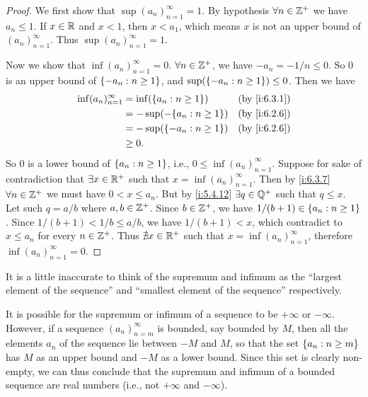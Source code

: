 \begin{proof}
  We first show that \(\sup(a_n)_{n = 1}^\infty = 1\).
  By hypothesis \(\forall n \in \mathbb{Z}^+\) we have \(a_n \leq 1\).
  If \(x \in \mathbb{R}\) and \(x < 1\), then \(x < a_1\), which means \(x\) is not an upper bound of \((a_n)_{n = 1}^\infty\).
  Thus \(\sup(a_n)_{n = 1}^\infty = 1\).

  Now we show that \(\inf(a_n)_{n = 1}^\infty = 0\).
  \(\forall n \in \mathbb{Z}^+\), we have \(-a_n = -1 / n \leq 0\).
  So \(0\) is an upper bound of \(\left\lbrace-a_n : n \geq 1\right\rbrace\), and \(\sup(\left\lbrace-a_n : n \geq 1\right\rbrace) \leq 0\).
  Then we have
  \begin{align*}
    \inf(a_n)_{n = 1}^\infty & = \inf(\set{a_n : n \geq 1})   &  & \by{i:6.3.1} \\
                             & = -\sup(-\set{a_n : n \geq 1}) &  & \by{i:6.2.6} \\
                             & = -\sup(\set{-a_n : n \geq 1}) &  & \by{i:6.2.6} \\
                             & \geq 0.
  \end{align*}
  So \(0\) is a lower bound of \(\left\lbrace a_n : n \geq 1\right\rbrace\), i.e., \(0 \leq \inf(a_n)_{n = 1}^\infty\).
  Suppose for sake of contradiction that \(\exists x \in \mathbb{R}^+\) such that \(x = \inf(a_n)_{n = 1}^\infty\).
  Then by \cref{i:6.3.7} \(\forall n \in \mathbb{Z}^+\) we must have \(0 < x \leq a_n\).
  But by \cref{i:5.4.12} \(\exists q \in \mathbb{Q}^+\) such that \(q \leq x\).
  Let such \(q = a / b\) where \(a, b \in \mathbb{Z}^+\).
  Since \(b \in \mathbb{Z}^+\), we have \(1 / (b + 1) \in \left\lbrace a_n : n \geq 1\right\rbrace\).
  Since \(1 / (b + 1) < 1 / b \leq a / b\), we have \(1 / (b + 1) < x\), which contradict to \(x \leq a_n\) for every \(n \in \mathbb{Z}^+\).
  Thus \(\nexists x \in \mathbb{R}^+\) such that \(x = \inf(a_n)_{n = 1}^\infty\), therefore \(\inf(a_n)_{n = 1}^\infty = 0\).
\end{proof}

\begin{note}
  It is a little inaccurate to think of the supremum and infimum as the ``largest element of the sequence'' and ``smallest element of the sequence'' respectively.
\end{note}

\begin{note}
  It is possible for the supremum or infimum of a sequence to be \(+\infty\) or \(-\infty\).
  However, if a sequence \((a_n)_{n = m}^\infty\) is bounded, say bounded by \(M\), then all the elements \(a_n\) of the sequence lie between \(-M\) and \(M\), so that the set \(\left\lbrace a_n : n \geq m\right\rbrace\) has \(M\) as an upper bound and \(-M\) as a lower bound.
  Since this set is clearly non-empty, we can thus conclude that the supremum and infimum of a bounded sequence are real numbers (i.e., not \(+\infty\) and \(-\infty\)).
\end{note}

